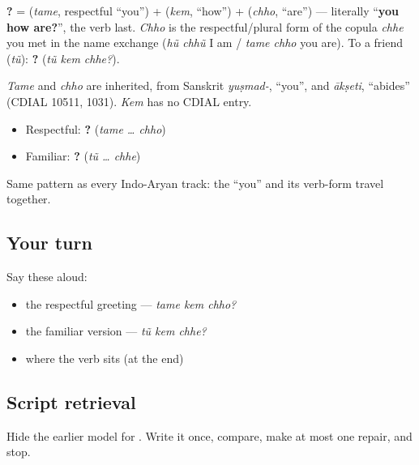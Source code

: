\begin{cousinweb}
\textbf{  ?} = \textbf{} (\emph{tame}, respectful \textquotedblleft{}you\textquotedblright{}) + \textbf{} (\emph{kem}, \textquotedblleft{}how\textquotedblright{}) + \textbf{} (\emph{chho}, \textquotedblleft{}are\textquotedblright{}) — literally \textquotedblleft{}\textbf{you how are?}\textquotedblright{}, the verb last. \emph{Chho} is the respectful/plural form of the copula \emph{chhe} you met in the name exchange (\emph{hũ chhũ} I am / \emph{tame chho} you are). To a friend (\emph{tũ}): \textbf{  ?} (\emph{tũ kem chhe?}).
\end{cousinweb}

\begin{cousinweb}
\emph{Tame} and \emph{chho} are inherited, from Sanskrit \emph{yuṣmad-}, \textquotedblleft{}you\textquotedblright{}, and \emph{ākṣeti}, \textquotedblleft{}abides\textquotedblright{} (CDIAL 10511, 1031). \emph{Kem} has no CDIAL entry.
\end{cousinweb}

\begin{grammarlens}[title={Grammar Lens: match the \textquotedblleft{}you\textquotedblright{} to the copula}]
\begin{itemize}
\raggedright
  \item Respectful: \textbf{  ?} (\emph{tame … chho})
  \item Familiar: \textbf{  ?} (\emph{tũ … chhe})
\end{itemize}

Same pattern as every Indo-Aryan track: the \textquotedblleft{}you\textquotedblright{} and its verb-form travel together.
\end{grammarlens}

\subsection*{Your turn}
Say these aloud:

\begin{itemize}
\raggedright
  \item the respectful greeting — \emph{tame kem chho?}
  \item the familiar version — \emph{tũ kem chhe?}
  \item where the verb sits (at the end)
\end{itemize}

\subsection*{Script retrieval}
Hide the earlier model for \textbf{}. Write it once, compare, make at most one repair, and stop.

